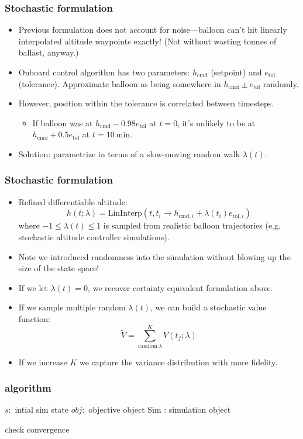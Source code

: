 \documentclass[10pt,mathserif]{beamer}
\begin{document}
\begin{frame}
\frametitle{Stochastic formulation}
\begin{itemize}
\item Previous formulation does not account for noise---balloon can't hit linearly interpolated altitude waypoints exactly! (Not without wasting tonnes of ballast, anyway.)
\item Onboard control algorithm has two parameters: $h_\text{cmd}$ (setpoint) and $e_\text{tol}$ (tolerance). Approximate balloon as being somewhere in $h_\text{cmd}\pm e_\text{tol}$ randomly.
\item However, position within the tolerance is correlated between timesteps.
\begin{itemize}
\item If balloon was at $h_\text{cmd} - 0.98e_\text{tol}$ at $t=0$, it's unlikely to be at $h_\text{cmd} + 0.5e_\text{tol}$ at $t=10~\text{min}$.
\end{itemize}
\item Solution: parametrize in terms of a slow-moving random walk $\lambda(t)$.
\end{itemize}
\end{frame}

\begin{frame}
\frametitle{Stochastic formulation}

\begin{itemize}
\item Refined differentiable altitude:
\[h(t; \lambda) =
\text{LinInterp}\left(t, t_i \to h_{\text{cmd},i} + \lambda(t_i) e_{\text{tol},i}\right)
\]
where $-1 \leq \lambda(t) \leq 1$ is sampled from realistic balloon trajectories (e.g. stochastic altitude controller simulations).
\item Note we introduced randomness into the simulation without blowing up the size of the state space!
\item If we let $\lambda(t)=0$, we recover certainty equivalent formulation above.
\item If we sample multiple random $\lambda(t)$, we can build a stochastic value function:
\[\tilde V = \sum_{\text{random}~\lambda}^K V(t_f; \lambda)\]
\item If we increase $K$ we capture the variance distribution with more fidelity.
\end{itemize}

\end{frame}

\begin{frame}
\frametitle{algorithm}
\begin{algorithmic}[1]
\State$s:$ intial sim state
\State$obj:$ objective object
\State Sim : simulation object
\EndFor 

check convergence
\EndWhile
\EndProcedure
\end{algorithmic}
\end{frame}
\end{document}
